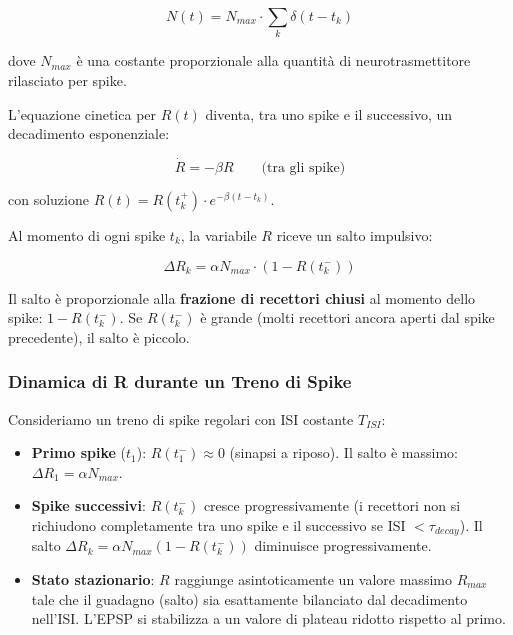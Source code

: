 \begin{equation}
N(t) = N_{max} \cdot \sum_k \delta(t - t_k)
\end{equation}

dove $N_{max}$ è una costante proporzionale alla quantità di neurotrasmettitore rilasciato per spike.

L'equazione cinetica per $R(t)$ diventa, tra uno spike e il successivo, un decadimento esponenziale:

\begin{equation}
\dot{R} = -\beta R \qquad \text{(tra gli spike)}
\end{equation}

con soluzione $R(t) = R(t_k^+) \cdot e^{-\beta(t - t_k)}$.

Al momento di ogni spike $t_k$, la variabile $R$ riceve un salto impulsivo:

\begin{equation}
\Delta R_k = \alpha N_{max} \cdot (1 - R(t_k^-))
\end{equation}

Il salto è proporzionale alla \textbf{frazione di recettori chiusi} al momento dello spike: $1 - R(t_k^-)$. Se $R(t_k^-)$ è grande (molti recettori ancora aperti dal spike precedente), il salto è piccolo.

\subsubsection{Dinamica di R durante un Treno di Spike}

Consideriamo un treno di spike regolari con ISI costante $T_{ISI}$:

\begin{itemize}
    \item \textbf{Primo spike} ($t_1$): $R(t_1^-) \approx 0$ (sinapsi a riposo). Il salto è massimo: $\Delta R_1 = \alpha N_{max}$.
    \item \textbf{Spike successivi}: $R(t_k^-)$ cresce progressivamente (i recettori non si richiudono completamente tra uno spike e il successivo se ISI $< \tau_{decay}$). Il salto $\Delta R_k = \alpha N_{max}(1 - R(t_k^-))$ diminuisce progressivamente.
    \item \textbf{Stato stazionario}: $R$ raggiunge asintoticamente un valore massimo $R_{max}$ tale che il guadagno (salto) sia esattamente bilanciato dal decadimento nell'ISI. L'EPSP si stabilizza a un valore di plateau ridotto rispetto al primo.
\end{itemize}

